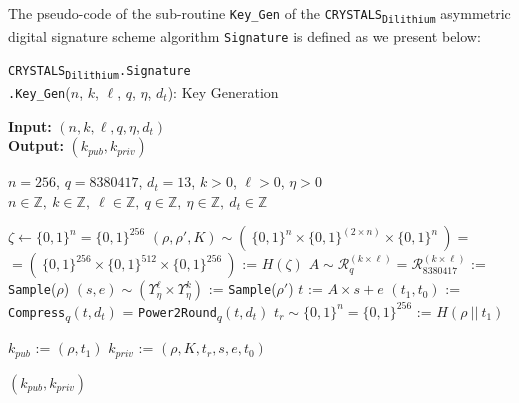 \documentclass[runningheads]{llncs}
\numberwithin{equation}{section}
\begin{document}
    \noindent The pseudo-code of the sub-routine \texttt{Key\_Gen} of the \texorpdfstring{\texttt{CRYSTALS}\textsubscript{\texttt{Dilithium}}}\/ asymmetric digital signature scheme algorithm \texttt{Signature} is defined as we present below:
    \vspace{-3.75ex}
    \begin{algorithm}
        \caption{\texorpdfstring{\texttt{CRYSTALS}\textsubscript{\texttt{Dilithium}}\texttt{.Signature}\\ \phantom{......................................................}\texttt{.Key\_Gen}($n$, $k$, $\ell$, $q$, $\eta$, ${d}_{t}$)}\/: Key Generation}
        \label{subrou:crystals-dilithium-key-gen}
        
        \textbf{Input:} $\left( n, k, \ell, q, \eta, {d}_{t} \right)$\\
        \textbf{Output:} $ ( {k}_{pub}, {k}_{priv} ) $
    
        \begin{algorithmic}[1]
            \Require $n = 256$, $q = 8380417$, ${d}_{t} = 13$, $k > 0$, $\ell > 0$, $\eta > 0$
            \Ensure $n \in \mathbb{Z},\ k \in \mathbb{Z},\ \ell \in \mathbb{Z},\ q \in \mathbb{Z},\ \eta \in \mathbb{Z},\ {d}_{t} \in \mathbb{Z}$
            
            \vspace{2ex}
            
            \State $\zeta \gets { \{ 0 , 1 \} }^{n} = { \{ 0 , 1 \} }^{256}$
            \State $(\rho, \rho', K) \sim \left(\ { \{ 0 , 1 \} }^{n} \times { \{ 0 , 1 \} }^{ (2 \times n) } \times { \{ 0 , 1 \} }^{n}\ \right) = $
            \Statex \hspace{15ex} $ = \left(\ { \{ 0 , 1 \} }^{256} \times { \{ 0 , 1 \} }^{512} \times { \{ 0 , 1 \} }^{256}\ \right)$ := $H( \zeta )$
            \State $A \sim {\mathcal{R}}_{q}^{( k \times \ell )} = {\mathcal{R}}_{8380417}^{( k \times \ell )}$ := \texttt{Sample}($\rho$)
            \State $(s, e) \sim \left( {\Upsilon}_{\eta}^{\ell} \times {\Upsilon}_{\eta}^{k} \right)$ := \texttt{Sample}($\rho'$)
            \State $t$ := $A \times s + e$
            \State $({t}_{1}, {t}_{0})$ := \texttt{Compress}\textsubscript{$q$}$\left( t, {d}_{t} \right)$ = \texttt{Power2Round}\textsubscript{$q$}$\left( t, {d}_{t} \right)$
            \State ${t}_{r} \sim { \{ 0 , 1 \} }^{n} = { \{ 0 , 1 \} }^{256}$ := $H\left( \rho\ ||\ {t}_{1} \right)$
            
            \vspace{1ex}
            
            \State ${k}_{pub}$ := $\left( \rho, {t}_{1} \right)$
            \State ${k}_{priv}$ := $\left( \rho, K, {t}_{r}, s, e, {t}_{0} \right)$
            
            \vspace{1ex}
            
            \State \Return $( {k}_{pub}, {k}_{priv} )$
        \end{algorithmic}
   
    \end{algorithm}
    \vspace{-3.75ex}
\end{document}

